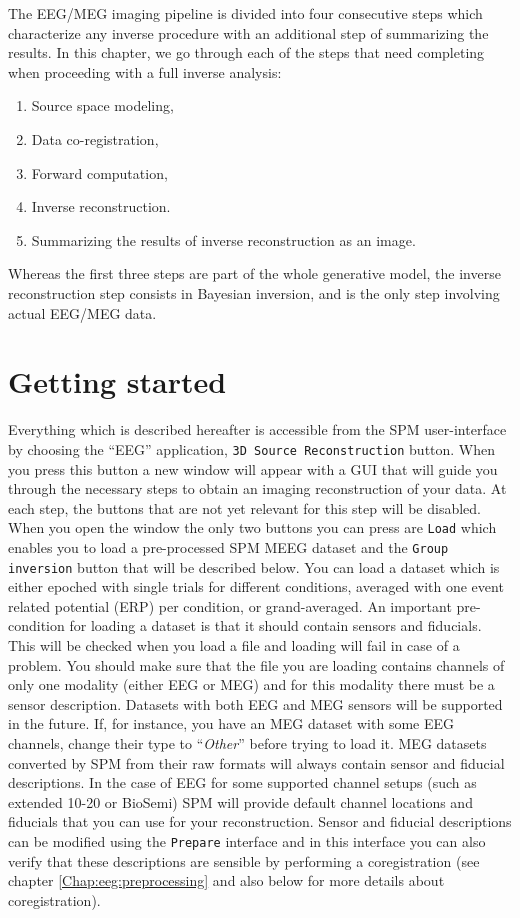 The EEG/MEG imaging pipeline is divided into four consecutive steps which characterize any inverse procedure with an additional step of summarizing the results. In this chapter, we go through each of the steps that need completing when proceeding with a full inverse analysis:

\begin{enumerate}
    \item Source space modeling,
    \item Data co-registration,
    \item Forward computation,
    \item Inverse reconstruction.
    \item Summarizing the results of inverse reconstruction as an image.
\end{enumerate}

Whereas the first three steps are part of the whole generative model, the inverse reconstruction step consists in Bayesian inversion, and is the only step involving actual EEG/MEG data.\\

\section{Getting started}

Everything which is described hereafter is accessible from the SPM user-interface by choosing the ``EEG'' application, \texttt{3D Source Reconstruction} button. When you press this button a new window will appear with a GUI that will guide you through the necessary steps to obtain an imaging reconstruction of your data. At each step, the buttons that are not yet relevant for this step will be disabled. When you open the window the only two buttons you can press are \texttt{Load} which enables you to load a pre-processed SPM MEEG dataset and the \texttt{Group inversion} button that will be described below. You can load a dataset which is either epoched with single trials for different conditions, averaged with one event related potential (ERP) per condition, or grand-averaged. An important pre-condition for loading a dataset is that it should contain sensors and fiducials. This will be checked when you load a file and loading will fail in case of a problem. You should make sure that the file you are loading contains channels of only one modality (either EEG or MEG) and for this modality there must be a sensor description. Datasets with both EEG and MEG sensors will be supported in the future. If, for instance, you have an MEG dataset with some EEG channels, change their type to ``\textit{Other}'' before trying to load it. MEG datasets converted by SPM from their raw formats will always contain sensor and fiducial descriptions. In the case of EEG for some supported channel setups (such as extended 10-20 or BioSemi) SPM will provide default channel locations and fiducials that you can use for your reconstruction. Sensor and fiducial descriptions can be modified using the \texttt{Prepare} interface and in this interface you can also verify that these descriptions are sensible by performing a coregistration (see chapter \ref{Chap:eeg:preprocessing} and also below for more details about coregistration).

